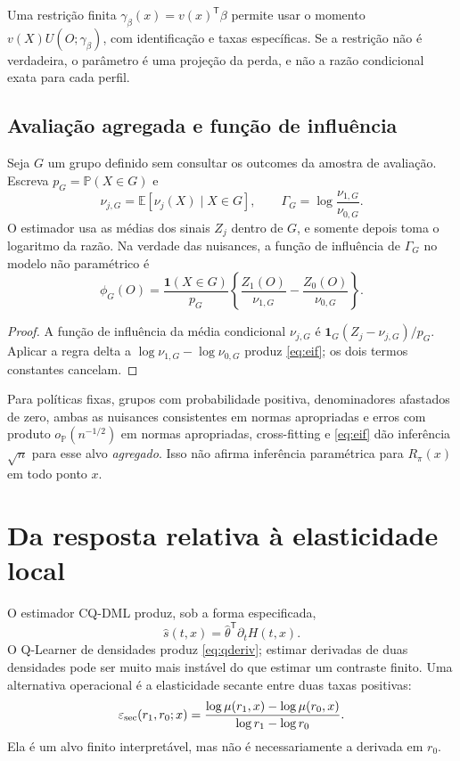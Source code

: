 \documentclass[11pt,a4paper]{article}
\newcommand{\E}{\mathbb E}
\newcommand{\Pp}{\mathbb P}
\newcommand{\ind}{\mathbf 1}
\newcommand{\op}{o_{\Pp}}
\begin{document}
Uma restrição finita $\gamma_\beta(x)=v(x)^{\mathsf T}\beta$ permite usar o momento $v(X)U(O;\gamma_\beta)$, com identificação e taxas específicas. Se a restrição não é verdadeira, o parâmetro é uma projeção da perda, e não a razão condicional exata para cada perfil.

\subsection{Avaliação agregada e função de influência}
Seja $G$ um grupo definido sem consultar os outcomes da amostra de avaliação. Escreva $p_G=\Pp(X\in G)$ e
\[
\nu_{j,G}=\E[\nu_j(X)\mid X\in G],\qquad
\Gamma_G=\log\frac{\nu_{1,G}}{\nu_{0,G}}.
\]
O estimador usa as médias dos sinais $Z_j$ dentro de $G$, e somente depois toma o logaritmo da razão. Na verdade das nuisances, a função de influência de $\Gamma_G$ no modelo não paramétrico é
\begin{equation}
\phi_G(O)=\frac{\ind(X\in G)}{p_G}
\left\{\frac{Z_1(O)}{\nu_{1,G}}-\frac{Z_0(O)}{\nu_{0,G}}\right\}.
\label{eq:eif}
\end{equation}
\begin{proof}
A função de influência da média condicional $\nu_{j,G}$ é $\ind_G(Z_j-\nu_{j,G})/p_G$. Aplicar a regra delta a $\log\nu_{1,G}-\log\nu_{0,G}$ produz \eqref{eq:eif}; os dois termos constantes cancelam.
\end{proof}
Para políticas fixas, grupos com probabilidade positiva, denominadores afastados de zero, ambas as nuisances consistentes em normas apropriadas e erros com produto $\op(n^{-1/2})$ em normas apropriadas, cross-fitting e \eqref{eq:eif} dão inferência $\sqrt n$ para esse alvo \emph{agregado}. Isso não afirma inferência paramétrica para $R_\pi(x)$ em todo ponto $x$.

\section{Da resposta relativa à elasticidade local}
\label{sec:local}
O estimador CQ-DML produz, sob a forma especificada,
\[
\hat s(t,x)=\hat\theta^{\mathsf T}\partial_t H(t,x).
\]
O Q-Learner de densidades produz \eqref{eq:qderiv}; estimar derivadas de duas densidades pode ser muito mais instável do que estimar um contraste finito. Uma alternativa operacional é a elasticidade secante entre duas taxas positivas:
\begin{equation}
\varepsilon_{\rm sec}(r_1,r_0;x)
=\frac{\log\mu(r_1,x)-\log\mu(r_0,x)}{\log r_1-\log r_0}.
\label{eq:secant}
\end{equation}
Ela é um alvo finito interpretável, mas não é necessariamente a derivada em $r_0$.
\end{document}
